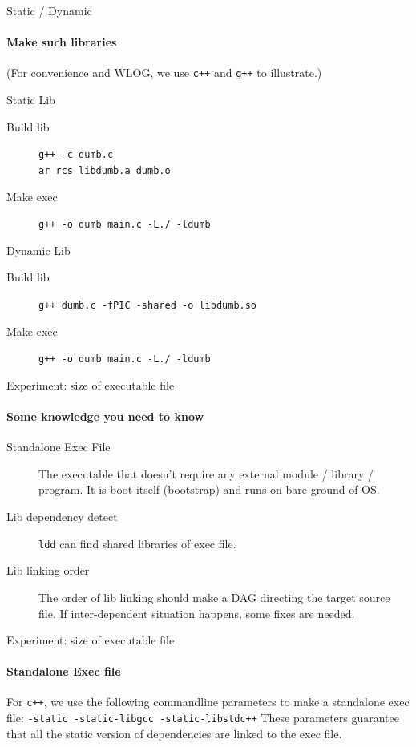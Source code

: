 \begin{frame}{Static / Dynamic}
    \framesubtitle{Make such libraries}

    (For convenience and WLOG, we use \texttt{c++} and \texttt{g++} to
    illustrate.)

    \begin{block}{Static Lib}
        \begin{description}
        \item[Build lib] \texttt{g++ -c dumb.c}\\\texttt{ar rcs libdumb.a dumb.o}
        \item[Make exec] \texttt{g++ -o dumb main.c -L./ -ldumb}
        \end{description}
    \end{block}
    \begin{block}{Dynamic Lib}
        \begin{description}
        \item[Build lib] \texttt{g++ dumb.c -fPIC -shared -o libdumb.so}
        \item[Make exec] \texttt{g++ -o dumb main.c -L./ -ldumb}
        \end{description}
    \end{block}
\end{frame}

\begin{frame}{Experiment: size of executable file}
    \framesubtitle{Some knowledge you need to know}
    \begin{description}
    \item[Standalone Exec File]{The executable that doesn't require any
          external module / library / program. It is boot itself (bootstrap) and
          runs on bare ground of OS.}
    \item[Lib dependency detect]{\texttt{ldd} can find shared libraries of exec
          file.}
    \item[Lib linking order]{The order of lib linking should make a DAG
          directing the target source file. If inter-dependent situation
          happens, some fixes are needed.}
    \end{description}

\end{frame}

\begin{frame}{Experiment: size of executable file}
    \framesubtitle{Standalone Exec file}
    For \texttt{c++}, we use the following commandline parameters to make a
    standalone exec file:
    \newline\newline
    \texttt{-static -static-libgcc -static-libstdc++}
    \newline\newline
    These parameters guarantee that all the static version of dependencies are
    linked to the exec file.

\end{frame}

